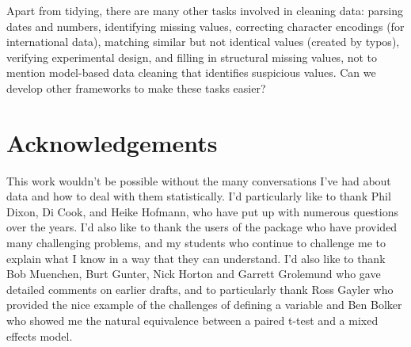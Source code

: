 \documentclass[article]{jss}
\begin{document}
Apart from tidying, there are many other tasks involved in cleaning data: parsing dates and numbers, identifying missing values, correcting character encodings (for international data), matching similar but not identical values (created by typos), verifying experimental design, and filling in structural missing values, not to mention model-based data cleaning that identifies suspicious values. Can we develop other frameworks to make these tasks easier?


\section{Acknowledgements} 
\label{sec:acknowledgements}

This work wouldn't be possible without the many conversations I've had about data and how to deal with them statistically. I'd particularly like to thank Phil Dixon, Di Cook, and Heike Hofmann, who have put up with numerous questions over the years. I'd also like to thank the users of the  package who have provided many challenging problems, and my students who continue to challenge me to explain what I know in a way that they can understand. I'd also like to thank Bob Muenchen, Burt Gunter, Nick Horton and Garrett Grolemund who gave detailed comments on earlier drafts, and to particularly thank Ross Gayler who provided the nice example of the challenges of defining a variable and Ben Bolker who showed me the natural equivalence between a paired t-test and a mixed effects model. 


\end{document}
